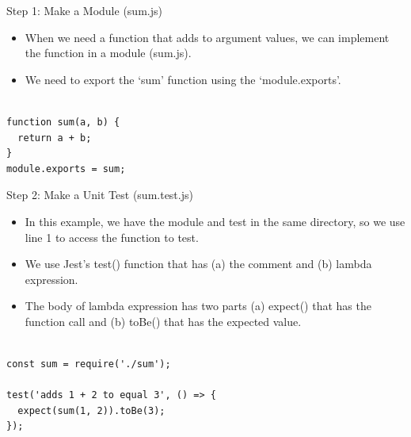 \begin{frame}[fragile]{Step 1: Make a Module (sum.js)}

\begin{itemize}
	\item When we need a function that adds to argument values, we can implement the function in a module (sum.js). 
	\item We need to export the `sum' function using the `module.exports'.
\end{itemize}

\begin{Code}{}%
\begin{lstlisting}[firstnumber=1, label=glabels, xleftmargin=0pt, basicstyle=\scriptsize]% 

function sum(a, b) {
  return a + b;
}
module.exports = sum;
\end{lstlisting}%
\end{Code}%

\end{frame}

\begin{frame}[fragile]{Step 2: Make a Unit Test (sum.test.js)}

\begin{itemize}
	\item In this example, we have the module and test in the same directory, so we use line 1 to access the function to test.
	\item We use Jest's test() function that has (a) the comment and (b) lambda expression.
	\item The body of lambda expression has two parts (a) expect() that has the function call and (b) toBe() that has the expected value.
\end{itemize}

\begin{Code}{}%
\begin{lstlisting}[firstnumber=1, label=glabels, xleftmargin=0pt, basicstyle=\tiny]% 

const sum = require('./sum');

test('adds 1 + 2 to equal 3', () => {
  expect(sum(1, 2)).toBe(3);
});
\end{lstlisting}%
\end{Code}%

\end{frame}

